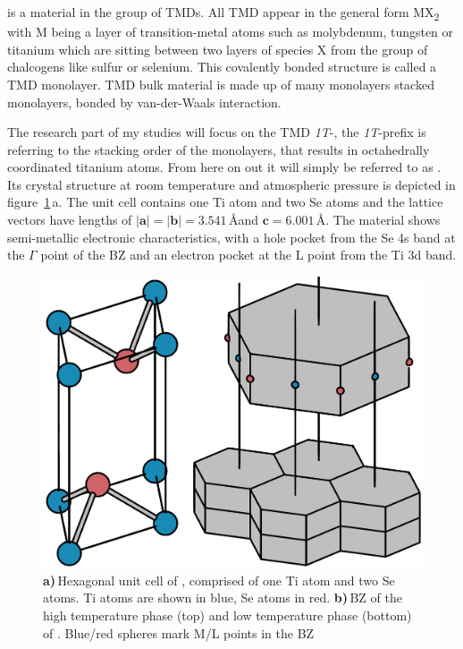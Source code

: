\ts\space is a material in the group of \acp{TMD}.
All \ac{TMD} appear in the general form MX\textsubscript{2} with M being a layer of transition-metal atoms such as molybdenum, tungsten or titanium which are sitting between two layers of species X from the group of chalcogens like sulfur or selenium.
This covalently bonded structure is called a \ac{TMD} monolayer.
\Ac{TMD} bulk material is made up of many monolayers stacked monolayers, bonded by van-der-Waals interaction.

The research part of my studies will focus on the \ac{TMD} \textit{1T}-\ts, the \textit{1T}-prefix is referring to the stacking order of the monolayers, that results in octahedrally coordinated titanium atoms.
From here on out it will simply be referred to as \ts.
Its crystal structure at room temperature and atmospheric pressure is depicted in figure~\ref{fig:crystal}\,a.
The unit cell contains one Ti atom and two Se atoms and the lattice vectors have lengths of $|\mathbf{a}|=|\mathbf{b}|=3.541$\,\AA\space and $\mathbf{c}=6.001$\,\AA\cite{patel1983}.
The material shows semi-metallic electronic characteristics\cite{bachrach1976}, with a hole pocket from the Se 4s band at the $\Gamma$ point of the \ac{BZ} and an electron pocket at the L point from the Ti 3d band\cite{zunger1978}.

\begin{figure}[!t]
	\begin{minipage}{0.5\columnwidth}
		\includegraphics[width=\columnwidth]{figs/tise2_crystal.png}
	\end{minipage}
	\hspace{0.04\columnwidth}
	\begin{minipage}{0.45\columnwidth}
		\caption{\textbf{a)}\,Hexagonal unit cell of \ts, comprised of one Ti atom and two Se atoms. Ti atoms are shown in blue, Se atoms in red. \textbf{b)}\,\ac{BZ} of the high temperature phase (top) and low temperature phase (bottom) of \ts. Blue/red spheres mark M/L points in the \ac{BZ}}
		\label{fig:crystal}
	\end{minipage}
\end{figure}

